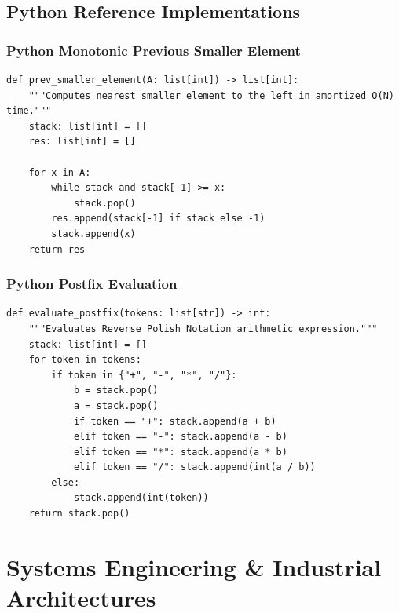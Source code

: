 \documentclass[10pt,journal,compsoc,onecolumn]{IEEEtran}
\begin{document}
\subsection{Python Reference Implementations}

\subsubsection{Python Monotonic Previous Smaller Element}
{\footnotesize
\begin{verbatim}
def prev_smaller_element(A: list[int]) -> list[int]:
    """Computes nearest smaller element to the left in amortized O(N) time."""
    stack: list[int] = []
    res: list[int] = []

    for x in A:
        while stack and stack[-1] >= x:
            stack.pop()
        res.append(stack[-1] if stack else -1)
        stack.append(x)
    return res
\end{verbatim}
}

\subsubsection{Python Postfix Evaluation}
{\footnotesize
\begin{verbatim}
def evaluate_postfix(tokens: list[str]) -> int:
    """Evaluates Reverse Polish Notation arithmetic expression."""
    stack: list[int] = []
    for token in tokens:
        if token in {"+", "-", "*", "/"}:
            b = stack.pop()
            a = stack.pop()
            if token == "+": stack.append(a + b)
            elif token == "-": stack.append(a - b)
            elif token == "*": stack.append(a * b)
            elif token == "/": stack.append(int(a / b))
        else:
            stack.append(int(token))
    return stack.pop()
\end{verbatim}
}

\section{Systems Engineering \& Industrial Architectures}
\label{sec:systems}
\end{document}
